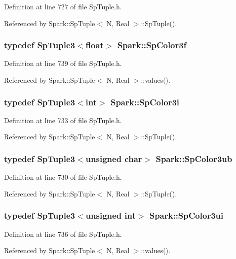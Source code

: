 Definition at line 727 of file Sp\-Tuple.h.

Referenced by Spark::Sp\-Tuple$<$ N, Real $>$::Sp\-Tuple().
\subsubsection{\setlength{\rightskip}{0pt plus 5cm}typedef Sp\-Tuple3$<$float$>$ {\bf Spark::Sp\-Color3f}}\label{namespaceSpark_a30}


Definition at line 739 of file Sp\-Tuple.h.

Referenced by Spark::Sp\-Tuple$<$ N, Real $>$::values().
\subsubsection{\setlength{\rightskip}{0pt plus 5cm}typedef Sp\-Tuple3$<$int$>$ {\bf Spark::Sp\-Color3i}}\label{namespaceSpark_a26}


Definition at line 733 of file Sp\-Tuple.h.

Referenced by Spark::Sp\-Tuple$<$ N, Real $>$::Sp\-Tuple().
\subsubsection{\setlength{\rightskip}{0pt plus 5cm}typedef Sp\-Tuple3$<$unsigned char$>$ {\bf Spark::Sp\-Color3ub}}\label{namespaceSpark_a24}


Definition at line 730 of file Sp\-Tuple.h.

Referenced by Spark::Sp\-Tuple$<$ N, Real $>$::Sp\-Tuple().
\subsubsection{\setlength{\rightskip}{0pt plus 5cm}typedef Sp\-Tuple3$<$unsigned int$>$ {\bf Spark::Sp\-Color3ui}}\label{namespaceSpark_a28}


Definition at line 736 of file Sp\-Tuple.h.

Referenced by Spark::Sp\-Tuple$<$ N, Real $>$::values().
